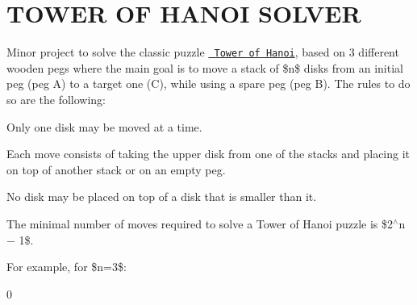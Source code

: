 \chapter{TOWER OF HANOI SOLVER}
\hypertarget{md__r_e_a_d_m_e}{}\label{md__r_e_a_d_m_e}
\label{md__r_e_a_d_m_e_autotoc_md0}%
%


Minor project to solve the classic puzzle \href{https://en.wikipedia.org/wiki/Tower_of_Hanoi}{\texttt{ Tower of Hanoi}}, based on 3 different wooden pegs where the main goal is to move a stack of \$n\$ disks from an initial peg (peg A) to a target one (C), while using a spare peg (peg B). The rules to do so are the following\+:


\begin{DoxyEnumerate}
\item Only one disk may be moved at a time.
\item Each move consists of taking the upper disk from one of the stacks and placing it on top of another stack or on an empty peg.
\item No disk may be placed on top of a disk that is smaller than it.
\end{DoxyEnumerate}

The minimal number of moves required to solve a Tower of Hanoi puzzle is \$2\texorpdfstring{$^\wedge$}{\string^}n − 1\$.

For example, for \$n=3\$\+: 
\begin{DoxyCode}{0}

\end{DoxyCode}


 